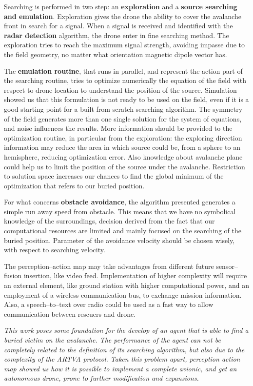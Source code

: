 Searching is performed in two step: an \textbf{exploration} and a \textbf{source searching and emulation}. Exploration gives the drone the ability to cover the avalanche front in search for a signal. When a signal is received and identified with the \textbf{radar detection} algorithm, the drone enter in fine searching method. The exploration tries to reach the maximum signal strength, avoiding impasse due to the field geometry, no matter what orientation magnetic dipole vector has.

The \textbf{emulation routine}, that runs in parallel, and represent the action part of the searching routine, tries to optimize numerically the equation of the field with respect to drone location to understand the position of the source. Simulation showed us that this formulation is not ready to be used on the field, even if it is a good starting point for a built from scratch searching algorithm. The symmetry of the field generates more than one single solution for the system of equations, and noise influences the results. More information should be provided to the optimization routine, in particular from the exploration: the exploring direction information may reduce the area in which source could be, from a sphere to an hemisphere, reducing optimization error. Also knowledge about avalanche plane could help us to limit the position of the source under the avalanche. Restriction to solution space increases our chances to find the global minimum of the optimization that refers to our buried position.

For what concerns \textbf{obstacle avoidance}, the algorithm presented generates a simple run away speed from obstacle. This means that we have no symbolical knowledge of the surroundings, decision derived from the fact that our computational resources are limited and mainly focused on the searching of the buried position. Parameter of the avoidance velocity should be chosen wisely, with respect to searching velocity.

The perception--action map may take advantages from different future sensor--fusion insertion, like video feed. Implementation of higher complexity will require an external element, like ground station with higher computational power, and an employment of a wireless communication bus, to exchange mission information. Also, a speech--to--text over radio could be used as a fast way to allow communication between rescuers and drone.

\emph{This work poses some foundation for the develop of an agent that is able to find a buried victim on the avalanche. The performance of the agent can not be completely related to the definition of its searching algorithm, but also due to the complexity of the ARTVA protocol. Taken this problem apart, perception action map showed us how it is possible to implement a complete avionic, and get an autonomous drone, prone to further modification and expansions.}